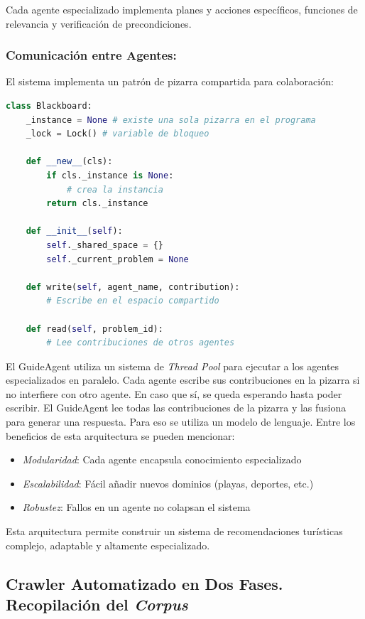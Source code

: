 \documentclass[10pt]{llncs}
\begin{document}
Cada agente especializado implementa planes y acciones específicos, funciones de relevancia y 
verificación de precondiciones.

\subsubsection{Comunicación entre Agentes:}
El sistema implementa un patrón de pizarra compartida para colaboración:

\begin{lstlisting}[language=Python,basicstyle=\small\ttfamily]
class Blackboard:
    _instance = None # existe una sola pizarra en el programa
    _lock = Lock() # variable de bloqueo

    def __new__(cls):
        if cls._instance is None:
            # crea la instancia
        return cls._instance

    def __init__(self):
        self._shared_space = {}
        self._current_problem = None
        
    def write(self, agent_name, contribution):
        # Escribe en el espacio compartido
        
    def read(self, problem_id):
        # Lee contribuciones de otros agentes
\end{lstlisting}

El GuideAgent utiliza un sistema de \textit{Thread Pool} para ejecutar a los agentes especializados en paralelo. 
Cada agente escribe sus contribuciones en la pizarra si no interfiere con otro agente. En caso que sí, se queda esperando hasta poder 
escribir. El GuideAgent lee todas las contribuciones de la pizarra y las fusiona para generar una respuesta. Para eso se utiliza un modelo 
de lenguaje.
Entre los beneficios de esta arquitectura se pueden mencionar:
\begin{itemize}
    \item \textit{Modularidad}: Cada agente encapsula conocimiento especializado
    \item \textit{Escalabilidad}: Fácil añadir nuevos dominios (playas, deportes, etc.)
    \item \textit{Robustez}: Fallos en un agente no colapsan el sistema
\end{itemize}

Esta arquitectura permite construir un sistema de recomendaciones turísticas complejo, adaptable y altamente especializado.

\vspace{\baselineskip}
\subsection{Crawler Automatizado en Dos Fases. Recopilación del \textit{Corpus}}
\end{document}
